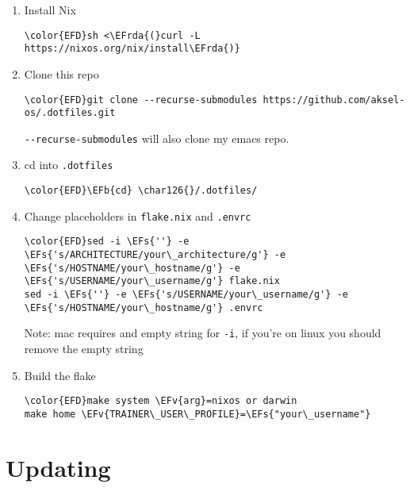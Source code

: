 \documentclass[11pt]{article}
\newcommand{\EFs}[1]{\textcolor{EFs}{#1}} %
\newcommand{\EFb}[1]{\textcolor{EFb}{#1}} %
\newcommand{\EFv}[1]{\textcolor{EFv}{\textbf{#1}}} %
\newcommand{\EFrda}[1]{\textcolor{EFrda}{#1}} %
\begin{document}
\begin{enumerate}
\item Install Nix
\begin{Code}
\begin{Verbatim}
\color{EFD}sh <\EFrda{(}curl -L https://nixos.org/nix/install\EFrda{)}
\end{Verbatim}
\end{Code}

\item Clone this repo
\begin{Code}
\begin{Verbatim}
\color{EFD}git clone --recurse-submodules https://github.com/aksel-os/.dotfiles.git    
\end{Verbatim}
\end{Code}

\texttt{-{}-{}recurse-submodules} will also clone my emacs repo.

\item cd into \texttt{.dotfiles}
\begin{Code}
\begin{Verbatim}
\color{EFD}\EFb{cd} \char126{}/.dotfiles/
\end{Verbatim}
\end{Code}

\item Change placeholders in \texttt{flake.nix} and \texttt{.envrc}
\begin{Code}
\begin{Verbatim}
\color{EFD}sed -i \EFs{''} -e \EFs{'s/ARCHITECTURE/your\_architecture/g'} -e \EFs{'s/HOSTNAME/your\_hostname/g'} -e \EFs{'s/USERNAME/your\_username/g'} flake.nix
sed -i \EFs{''} -e \EFs{'s/USERNAME/your\_username/g'} -e \EFs{'s/HOSTNAME/your\_hostname/g'} .envrc
\end{Verbatim}
\end{Code}

Note: mac requires and empty string for \texttt{-i}, if you're on linux you should
remove the empty string

\item Build the flake
\begin{Code}
\begin{Verbatim}
\color{EFD}make system \EFv{arg}=nixos or darwin
make home \EFv{TRAINER\_USER\_PROFILE}=\EFs{"your\_username"}
\end{Verbatim}
\end{Code}
\end{enumerate}
\section{Updating}
\label{sec:orga5dcb94}
\end{document}
